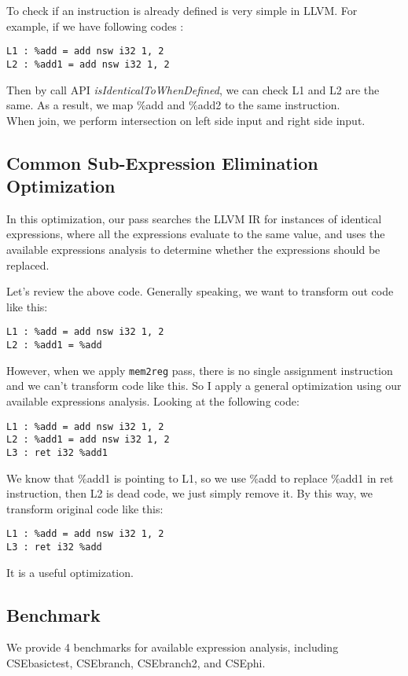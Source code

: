 To check if an instruction is already defined is very simple in LLVM. For example, if we have following codes :
\begin{verbatim}
L1 : %add = add nsw i32 1, 2
L2 : %add1 = add nsw i32 1, 2
\end{verbatim}
Then by call API \emph{isIdenticalToWhenDefined}, we can check L1 and L2 are the same. As a result, we map \%add and \%add2 to the same instruction. \\

When join, we perform intersection on left side input and right side input.

\subsection{Common Sub-Expression Elimination Optimization}

In this optimization, our pass searches the LLVM IR for instances of identical expressions, where all the expressions evaluate to the same value, and uses the available expressions analysis to determine whether the expressions should be replaced. 

Let's review the above code. Generally speaking, we want to transform out code like this:
\begin{verbatim}
L1 : %add = add nsw i32 1, 2
L2 : %add1 = %add
\end{verbatim}
However, when we apply \texttt{mem2reg} pass, there is no single assignment instruction and we can't transform code like this. So I apply a general optimization using our available expressions analysis. Looking at the following code:

\begin{verbatim}
L1 : %add = add nsw i32 1, 2
L2 : %add1 = add nsw i32 1, 2
L3 : ret i32 %add1
\end{verbatim}

We know that \%add1 is pointing to L1, so we use \%add to replace \%add1 in ret instruction, then L2 is dead code, we just simply remove it. By this way, we transform original code like this:
\begin{verbatim}
L1 : %add = add nsw i32 1, 2
L3 : ret i32 %add
\end{verbatim}

It is a useful optimization.

\subsection{Benchmark}
We provide 4 benchmarks for available expression analysis, including CSEbasictest, CSEbranch, CSEbranch2, and CSEphi.

